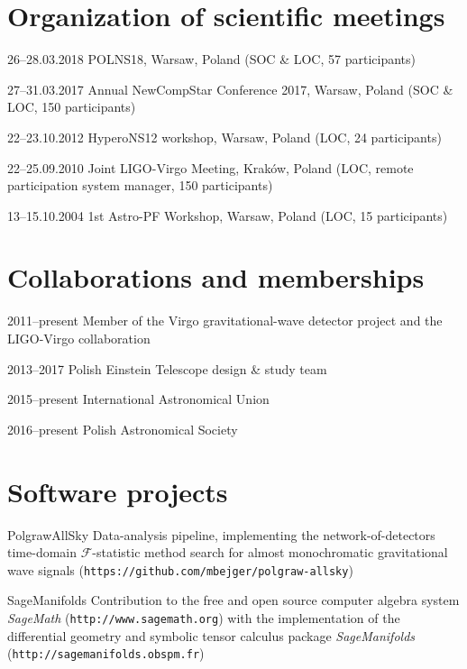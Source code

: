 \documentclass[]{friggeri-cv} %
\begin{document}
\vskip 0.5cm 
\section{Organization of scientific meetings}

\begin{entrylistshort}

\entrys
{26--28.03.2018} 
{POLNS18, Warsaw, Poland (SOC \& LOC, 57 participants)} 

\entrys
{27--31.03.2017} 
{Annual NewCompStar Conference 2017, Warsaw, Poland (SOC \& LOC, 150 participants)} 
 
\entrys
{22--23.10.2012} 
{HyperoNS12 workshop, Warsaw, Poland (LOC, 24 participants)} 

\entrys 
{22--25.09.2010} 
{Joint LIGO-Virgo Meeting, Kraków, Poland (LOC, remote participation system manager, 150 participants)} 

\entrys 
{13--15.10.2004} 
{1st Astro-PF Workshop, Warsaw, Poland (LOC, 15 participants)} 

\end{entrylistshort}


\vskip 0.5cm 
\section{Collaborations and memberships}

\begin{entrylistshort}

\entrys
{2011--present} 
{Member of the Virgo gravitational-wave detector project and the LIGO-Virgo collaboration}

\entrys
{2013--2017} 
{Polish Einstein Telescope design \& study team}

\entrys 
{2015--present}
{International Astronomical Union} 

\entrys
{2016--present}
{Polish Astronomical Society} 

\end{entrylistshort}

\section{Software projects} 

\begin{entrylistshort}

\entrys
{PolgrawAllSky} 
{Data-analysis pipeline, implementing the network-of-detectors time-domain $\mathcal{F}$-statistic method search for almost monochromatic gravitational wave signals ({\tt https://github.com/mbejger/polgraw-allsky})} 

\entrys 
{SageManifolds} 
{Contribution to the free and open source computer algebra system {\it SageMath} ({\tt http://www.sagemath.org}) with the implementation of the differential geometry and symbolic tensor calculus package {\it SageManifolds} ({\tt http://sagemanifolds.obspm.fr})}  

\end{entrylistshort}



\end{document}
